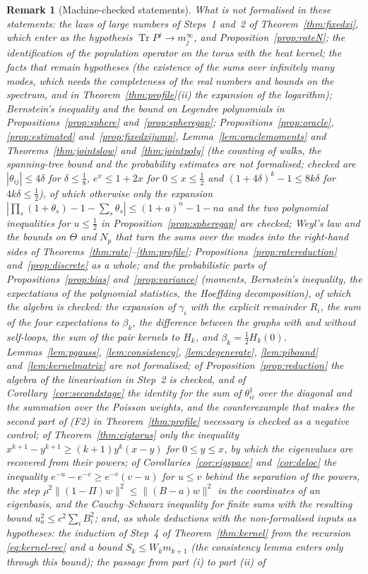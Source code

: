 \documentclass[11pt,a4paper]{article}
\theoremstyle{stmt}
\theoremstyle{defn}
\theoremstyle{rmk}
\newtheorem{remark}[theorem]{Remark}
\numberwithin{equation}{section}
\DeclareMathOperator{\Tr}{Tr}
\begin{document}
{\begin{remark}[Machine-checked statements]
What is not formalised in these statements: the laws of large numbers of Steps~1 and~2 of Theorem~\ref{thm:fixedxi}, which enter as the hypothesis $\Tr P^j\to m_j^\infty$, and Proposition~\ref{prop:rateN}; the identification of the population operator on the torus with the heat kernel; the facts that remain hypotheses (the existence of the sums over infinitely many modes, which needs the completeness of the real numbers and bounds on the spectrum, and in Theorem~\ref{thm:profile}(ii) the expansion of the logarithm); Bernstein's inequality and the bound on Legendre polynomials in Propositions~\ref{prop:sphere} and~\ref{prop:spheregap}; Propositions~\ref{prop:oracle}, \ref{prop:estimated} and~\ref{prop:fixedxijump}, Lemma~\ref{lem:oraclemoments} and Theorems~\ref{thm:jointslow} and~\ref{thm:jointpoly} (the counting of walks, the spanning-tree bound and the probability estimates are not formalised; checked are $|\theta_{ij}|\le4\delta$ for $\delta\le\tfrac18$, $e^x\le1+2x$ for $0\le x\le\tfrac12$ and $(1+4\delta)^k-1\le8k\delta$ for $4k\delta\le\tfrac12$), of which otherwise only the expansion $|\prod_s(1+\theta_s)-1-\sum_s\theta_s|\le(1+a)^n-1-na$ and the two polynomial inequalities for $u\le\tfrac12$ in Proposition~\ref{prop:spheregap} are checked; Weyl's law and the bounds on $\Theta$ and $N_p$ that turn the sums over the modes into the right-hand sides of Theorems~\ref{thm:rate}--\ref{thm:profile}; Propositions~\ref{prop:ratereduction} and~\ref{prop:discrete} as a whole; and the probabilistic parts of Propositions~\ref{prop:bias} and~\ref{prop:variance} (moments, Bernstein's inequality, the expectations of the polynomial statistics, the Hoeffding decomposition), of which the algebra is checked: the expansion of $\gamma_i$ with the explicit remainder $R_i$, the sum of the four expectations to $\beta_k$, the difference between the graphs with and without self-loops, the sum of the pair kernels to $H_k$, and $\beta_k=\frac12H_k(0)$. Lemmas~\ref{lem:pgauss}, \ref{lem:consistency}, \ref{lem:degenerate}, \ref{lem:pibound} and~\ref{lem:kernelmatrix} are not formalised; of Proposition~\ref{prop:reduction} the algebra of the linearisation in Step~2 is checked, and of Corollary~\ref{cor:secondstage} the identity for the sum of $\theta^1_{ii}$ over the diagonal and the summation over the Poisson weights, and the counterexample that makes the second part of \textup{(F2)} in Theorem~\ref{thm:profile} necessary is checked as a negative control; of Theorem~\ref{thm:eigtorus} only the inequality $x^{k+1}-y^{k+1}\ge(k+1)y^k(x-y)$ for $0\le y\le x$, by which the eigenvalues are recovered from their powers; of Corollaries~\ref{cor:eigspace} and~\ref{cor:deloc} the inequality $e^{-u}-e^{-v}\ge e^{-v}(v-u)$ for $u\le v$ behind the separation of the powers, the step $\rho^2\|(1-\Pi)w\|^2\le\|(B-a)w\|^2$ in the coordinates of an eigenbasis, and the Cauchy--Schwarz inequality for finite sums with the resulting bound $u_a^2\le c^2\sum_iB_i^2$; and, as whole deductions with the non-formalised inputs as hypotheses: the induction of Step~4 of Theorem~\ref{thm:kernel} from the recursion \eqref{eq:kernel-rec} and a bound $S_k\le W_km_{k+1}$ (the consistency lemma enters only through this bound); the passage from part (i) to part (ii) of 
\end{remark}}
\end{document}
